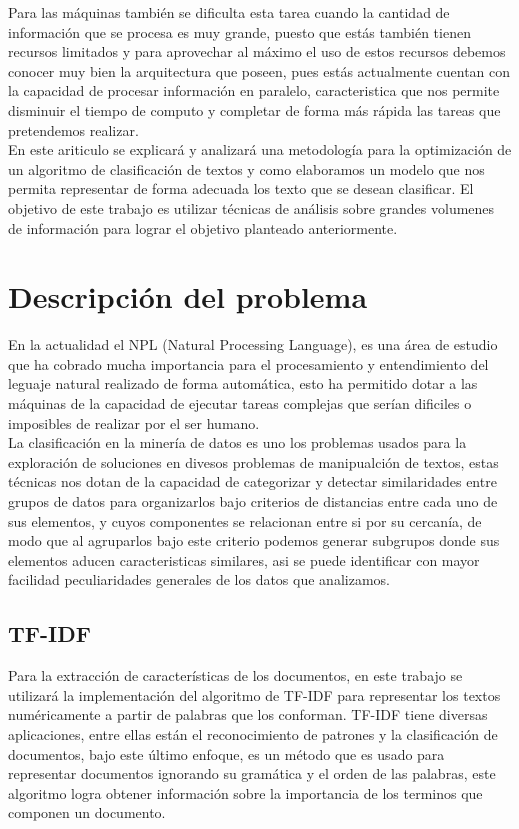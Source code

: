 \documentclass[conference,compsoc]{IEEEtran}
\begin{document}
Para las máquinas también se dificulta esta tarea cuando la cantidad de
información que se procesa es muy grande, puesto que estás también tienen
recursos limitados y para aprovechar al máximo el uso de estos recursos debemos
conocer muy bien la arquitectura que poseen, pues estás actualmente cuentan con
la capacidad de procesar información en paralelo, caracteristica que nos
permite disminuir el tiempo de computo y completar de forma más rápida las
tareas que pretendemos realizar.\\

En este ariticulo se explicará y analizará una metodología para la optimización
de un algoritmo de clasificación de textos y como elaboramos un modelo que nos
permita representar de forma adecuada los texto que se desean clasificar. El
objetivo de este trabajo es utilizar técnicas de análisis sobre grandes
volumenes de información para lograr el objetivo planteado anteriormente.

\section{Descripción del problema}

En la actualidad el NPL (Natural Processing Language), es una área de estudio
que ha cobrado mucha importancia para el procesamiento y entendimiento del
leguaje natural realizado de forma automática, esto ha permitido dotar a las
máquinas de la capacidad de ejecutar tareas complejas que serían dificiles o
imposibles de realizar por el ser humano.\\

La clasificación en la minería de datos es uno los problemas usados para la
exploración de soluciones en divesos problemas de manipualción de textos, estas
técnicas nos dotan de la capacidad de categorizar y detectar similaridades
entre grupos de datos para organizarlos bajo criterios de distancias entre cada
uno de sus elementos, y cuyos componentes se relacionan entre si por su
cercanía, de modo que al agruparlos bajo este criterio podemos generar
subgrupos donde sus elementos aducen caracteristicas similares, asi se puede
identificar con mayor facilidad peculiaridades generales de los datos que
analizamos.\\

\subsection{TF-IDF}
Para la extracción de características de los documentos, en este trabajo se
utilizará la implementación del algoritmo de TF-IDF para representar los textos
numéricamente a partir de palabras que los conforman. TF-IDF tiene diversas
aplicaciones, entre ellas están el reconocimiento de patrones y la
clasificación de documentos, bajo este último enfoque, es un método que es
usado para representar documentos ignorando su gramática y el orden de las
palabras, este algoritmo logra obtener información sobre la importancia de los
terminos que componen un documento.\\
\end{document}
